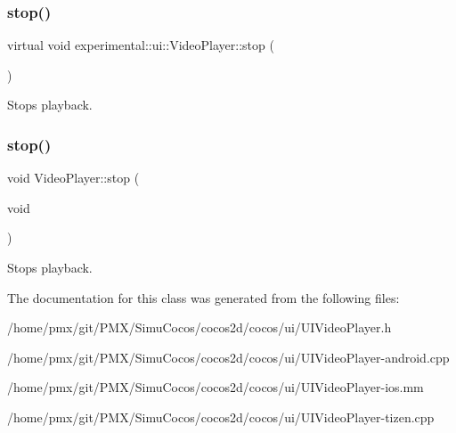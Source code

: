 \subsubsection{\texorpdfstring{stop()}{stop()}\hspace{0.1cm}{\footnotesize\ttfamily [1/2]}}
{\footnotesize\ttfamily virtual void experimental\+::ui\+::\+Video\+Player\+::stop (\begin{DoxyParamCaption}{ }\end{DoxyParamCaption})\hspace{0.3cm}{\ttfamily [virtual]}}

Stops playback. \mbox{\label{classexperimental_1_1ui_1_1VideoPlayer_a1f0ecb61a2f7860525be697832cb6b8d}} 
\subsubsection{\texorpdfstring{stop()}{stop()}\hspace{0.1cm}{\footnotesize\ttfamily [2/2]}}
{\footnotesize\ttfamily void Video\+Player\+::stop (\begin{DoxyParamCaption}\item[{void}]{ }\end{DoxyParamCaption})\hspace{0.3cm}{\ttfamily [virtual]}}

Stops playback. 

The documentation for this class was generated from the following files\+:\begin{DoxyCompactItemize}
\item 
/home/pmx/git/\+P\+M\+X/\+Simu\+Cocos/cocos2d/cocos/ui/U\+I\+Video\+Player.\+h\item 
/home/pmx/git/\+P\+M\+X/\+Simu\+Cocos/cocos2d/cocos/ui/U\+I\+Video\+Player-\/android.\+cpp\item 
/home/pmx/git/\+P\+M\+X/\+Simu\+Cocos/cocos2d/cocos/ui/U\+I\+Video\+Player-\/ios.\+mm\item 
/home/pmx/git/\+P\+M\+X/\+Simu\+Cocos/cocos2d/cocos/ui/U\+I\+Video\+Player-\/tizen.\+cpp\end{DoxyCompactItemize}
